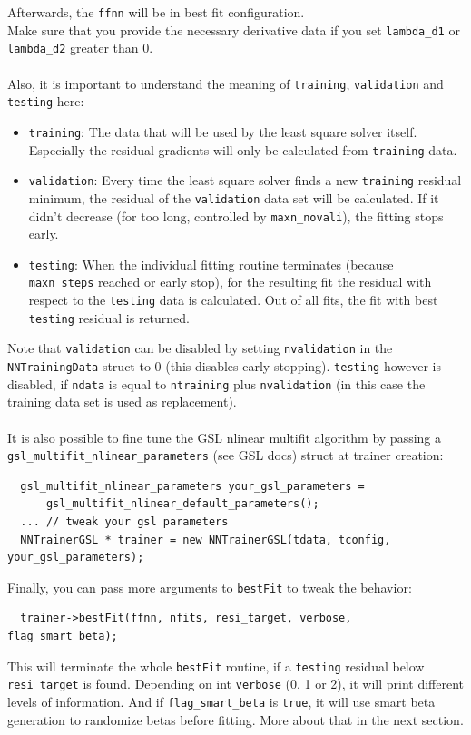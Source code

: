 \documentclass[11pt,a4paper,twoside]{article}
\begin{document}
Afterwards, the \verb+ffnn+ will be in best fit configuration.
\\Make sure that you provide the necessary derivative data if you set
\verb+lambda_d1+ or \verb+lambda_d2+ greater than 0.
\\\\Also, it is important to understand the meaning of \verb+training+, \verb+validation+ and \verb+testing+
here:
\begin{itemize}
\item \verb+training+: The data that will be used by the least square solver itself.
  Especially the residual gradients will only be calculated from \verb+training+ data.
\item \verb+validation+: Every time the least square solver finds a new \verb+training+
  residual minimum, the residual of the \verb+validation+ data set will be calculated. If
  it didn't decrease (for too long, controlled by \verb+maxn_novali+), the
  fitting stops early.
\item \verb+testing+: When the individual fitting routine terminates (because
  \\\verb+maxn_steps+ reached or early stop), for the resulting fit the residual with
  respect to the \verb+testing+ data is calculated. Out of all fits, the fit with best
  \verb+testing+ residual is returned.
\end{itemize}
Note that \verb+validation+ can be disabled by setting \verb+nvalidation+ in the
\\\verb+NNTrainingData+ struct to 0 (this disables early stopping). \verb+testing+ however is disabled, if
\verb+ndata+ is equal to \verb+ntraining+ plus \verb+nvalidation+ (in this case
the training data set is used as replacement).
\\\\It is also possible to fine tune the GSL nlinear multifit algorithm by passing a
\verb+gsl_multifit_nlinear_parameters+ (see GSL docs) struct at trainer
creation:

\begin{lstlisting}
  gsl_multifit_nlinear_parameters your_gsl_parameters =
      gsl_multifit_nlinear_default_parameters();
  ... // tweak your gsl parameters
  NNTrainerGSL * trainer = new NNTrainerGSL(tdata, tconfig, your_gsl_parameters);
\end{lstlisting}
Finally, you can pass more arguments to \verb+bestFit+ to tweak the behavior:

\begin{lstlisting}
  trainer->bestFit(ffnn, nfits, resi_target, verbose, flag_smart_beta);
\end{lstlisting}
This will terminate the whole \verb+bestFit+ routine, if a \verb+testing+
residual below \verb+resi_target+ is found. Depending on int \verb+verbose+ (0,
1 or 2), it will print different levels of information. And if
\verb+flag_smart_beta+ is \verb+true+, it will use smart beta generation to
randomize betas before fitting. More about that in the next section. 
\end{document}
